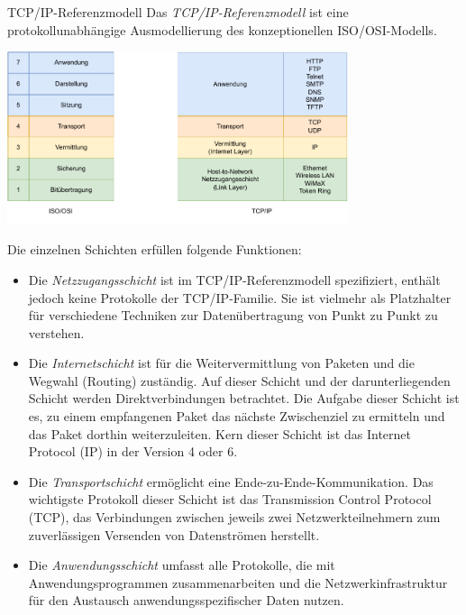 \begin{defi}{TCP/IP-Referenzmodell}
    Das \emph{TCP/IP-Referenzmodell} ist eine protokollunabhängige Ausmodellierung des konzeptionellen ISO/OSI-Modells.

    \begin{center}
        \includegraphics[width=0.75\textwidth]{includes/figures/defi_tcp_ip.pdf}
    \end{center}

    Die einzelnen Schichten erfüllen folgende Funktionen:
    \begin{itemize}
        \item Die \emph{Netzzugangsschicht} ist im TCP/IP-Referenzmodell spezifiziert, enthält jedoch keine Protokolle der TCP/IP-Familie.
              Sie ist vielmehr als Platzhalter für verschiedene Techniken zur Datenübertragung von Punkt zu Punkt zu verstehen.
        \item Die \emph{Internetschicht} ist für die Weitervermittlung von Paketen und die Wegwahl (Routing) zuständig.
              Auf dieser Schicht und der darunterliegenden Schicht werden Direktverbindungen betrachtet.
              Die Aufgabe dieser Schicht ist es, zu einem empfangenen Paket das nächste Zwischenziel zu ermitteln und das Paket dorthin weiterzuleiten.
              Kern dieser Schicht ist das Internet Protocol (IP) in der Version 4 oder 6.
        \item Die \emph{Transportschicht} ermöglicht eine Ende-zu-Ende-Kommunikation. Das wichtigste Protokoll dieser Schicht ist das Transmission Control Protocol (TCP), das Verbindungen zwischen jeweils zwei Netzwerkteilnehmern zum zuverlässigen Versenden von Datenströmen herstellt.
        \item Die \emph{Anwendungsschicht} umfasst alle Protokolle, die mit Anwendungsprogrammen zusammenarbeiten und die Netzwerkinfrastruktur für den Austausch anwendungsspezifischer Daten nutzen.
    \end{itemize}
\end{defi}